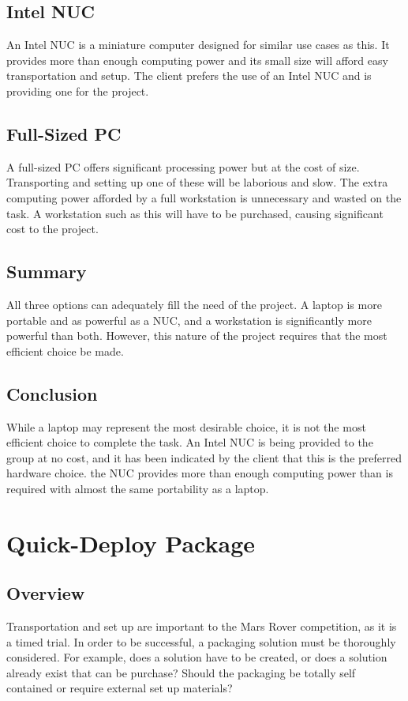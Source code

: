 \documentclass[onecolumn, draftclsnofoot, 10pt, compsoc]{IEEEtran}
\begin{document}
\subsection{Intel NUC}
An Intel NUC is a miniature computer designed for similar use cases as this.
It provides more than enough computing power and its small size will afford easy transportation and setup.
The client prefers the use of an Intel NUC and is providing one for the project.

\subsection{Full-Sized PC}
A full-sized PC offers significant processing power but at the cost of size.
Transporting and setting up one of these will be laborious and slow.
The extra computing power afforded by a full workstation is unnecessary and wasted on the task.
A workstation such as this will have to be purchased, causing significant cost to the project.

\subsection{Summary}
All three options can adequately fill the need of the project.
A laptop is more portable and as powerful as a NUC, and a workstation is significantly more powerful than both.
However, this nature of the project requires that the most efficient choice be made.

\subsection{Conclusion}
While a laptop may represent the most desirable choice, it is not the most efficient choice to complete the task.
An Intel NUC is being provided to the group at no cost, and it has been indicated by the client that this is the preferred hardware choice.
the NUC provides more than enough computing power than is required with almost the same portability as a laptop.

\section{Quick-Deploy Package}

\subsection{Overview}
Transportation and set up are important to the Mars Rover competition, as it is a timed trial.
In order to be successful, a packaging solution must be thoroughly considered.
For example, does a solution have to be created, or does a solution already exist that can be purchase?
Should the packaging be totally self contained or require external set up materials?
\end{document}

